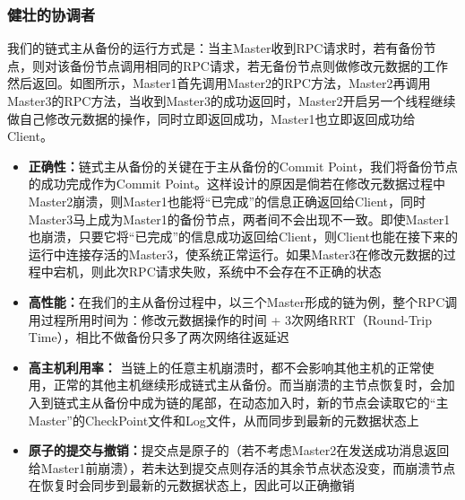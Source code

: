 \documentclass[UTF8]{ctexart}
\begin{document}
\subsubsection{健壮的协调者}
我们的链式主从备份的运行方式是：当主Master收到RPC请求时，若有备份节点，则对该备份节点调用相同的RPC请求，若无备份节点则做修改元数据的工作然后返回。如图所示，Master1首先调用Master2的RPC方法，Master2再调用Master3的RPC方法，当收到Master3的成功返回时，Master2开启另一个线程继续做自己修改元数据的操作，同时立即返回成功，Master1也立即返回成功给Client。
\begin{itemize}
\item \textbf{正确性：}链式主从备份的关键在于主从备份的Commit Point，我们将备份节点的成功完成作为Commit Point。这样设计的原因是倘若在修改元数据过程中Master2崩溃，则Master1也能将“已完成”的信息正确返回给Client，同时Master3马上成为Master1的备份节点，两者间不会出现不一致。即使Master1也崩溃，只要它将“已完成”的信息成功返回给Client，则Client也能在接下来的运行中连接存活的Master3，使系统正常运行。如果Master3在修改元数据的过程中宕机，则此次RPC请求失败，系统中不会存在不正确的状态
\item \textbf{高性能：}在我们的主从备份过程中，以三个Master形成的链为例，整个RPC调用过程所用时间为：修改元数据操作的时间 + 3次网络RRT（Round-Trip Time），相比不做备份只多了两次网络往返延迟
\item \textbf{高主机利用率：} 当链上的任意主机崩溃时，都不会影响其他主机的正常使用，正常的其他主机继续形成链式主从备份。而当崩溃的主节点恢复时，会加入到链式主从备份中成为链的尾部，在动态加入时，新的节点会读取它的“主Master”的CheckPoint文件和Log文件，从而同步到最新的元数据状态上
\item \textbf{原子的提交与撤销：}提交点是原子的（若不考虑Master2在发送成功消息返回给Master1前崩溃），若未达到提交点则存活的其余节点状态没变，而崩溃节点在恢复时会同步到最新的元数据状态上，因此可以正确撤销
\end{itemize}
\end{document}
